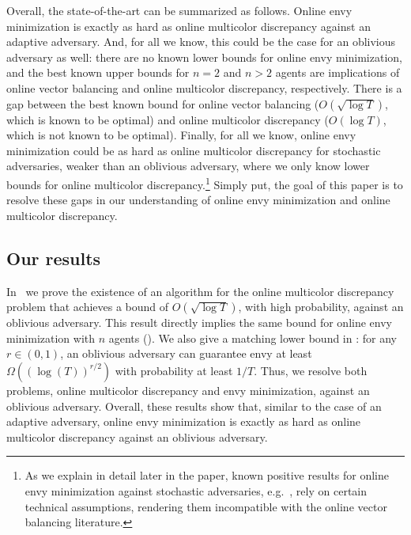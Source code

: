 Overall, the state-of-the-art can be summarized as follows. Online envy minimization is exactly as hard as online multicolor discrepancy against an adaptive adversary. And, for all we know, this could be the case for an oblivious adversary as well: there are no known lower bounds for online envy minimization, and the best known upper bounds for $n=2$ and $n>2$ agents are implications of online vector balancing and online multicolor discrepancy, respectively. There is a gap between the best known bound for online vector balancing ($O(\sqrt{\log T})$, which is known to be optimal) and online multicolor discrepancy ($O(\log T)$, which is not known to be optimal).
Finally, for all we know, online envy minimization could be as hard as online multicolor discrepancy for stochastic adversaries, weaker than an oblivious adversary, where we only know lower bounds for online multicolor discrepancy.\footnote{As we explain in detail later in the paper, known positive results for online envy minimization against stochastic adversaries, e.g.~\cite{benade2024fair}, rely on certain technical assumptions, rendering them incompatible with the online vector balancing literature.}
Simply put, the goal of this paper is to resolve these gaps in our understanding of online envy minimization and online multicolor discrepancy.


\subsection{Our results}



In~ we prove the existence of an algorithm for the online multicolor discrepancy problem that achieves a bound of $O(\sqrt{\log T})$, with high probability, against an oblivious adversary. This result directly implies the same bound for online envy minimization with $n$ agents (). We also give a matching lower bound in : for any $r \in (0,1)$, an oblivious adversary can guarantee envy at least $\Omega((\log(T))^{r/2})$ with probability at least $1/T$. Thus, we resolve both problems, online multicolor discrepancy and envy minimization, against an oblivious adversary. Overall, these results show that, similar to the case of an adaptive adversary, online envy minimization is exactly as hard as online multicolor discrepancy against an oblivious adversary.

